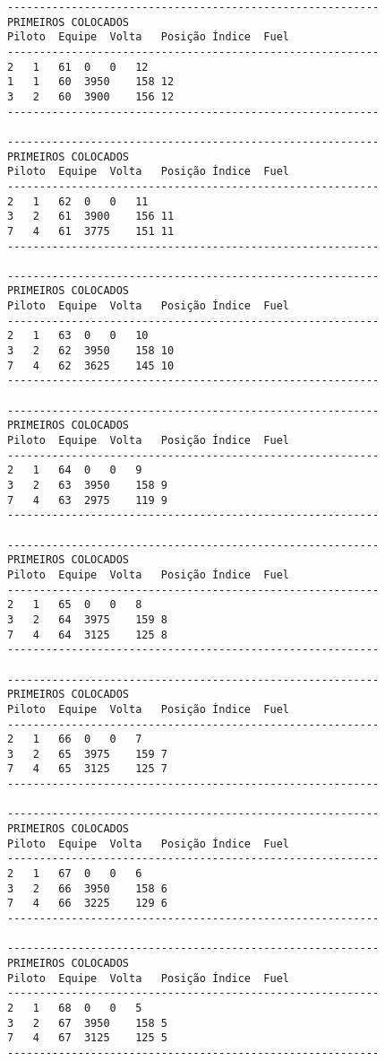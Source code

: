 \documentclass[12pt]{article}
\begin{document}
\begin{verbatim}
----------------------------------------------------------
PRIMEIROS COLOCADOS
Piloto	Equipe	Volta	Posição	Índice	Fuel
----------------------------------------------------------
2	1	61	0	0	12
1	1	60	3950	158	12
3	2	60	3900	156	12
----------------------------------------------------------

----------------------------------------------------------
PRIMEIROS COLOCADOS
Piloto	Equipe	Volta	Posição	Índice	Fuel
----------------------------------------------------------
2	1	62	0	0	11
3	2	61	3900	156	11
7	4	61	3775	151	11
----------------------------------------------------------

----------------------------------------------------------
PRIMEIROS COLOCADOS
Piloto	Equipe	Volta	Posição	Índice	Fuel
----------------------------------------------------------
2	1	63	0	0	10
3	2	62	3950	158	10
7	4	62	3625	145	10
----------------------------------------------------------

----------------------------------------------------------
PRIMEIROS COLOCADOS
Piloto	Equipe	Volta	Posição	Índice	Fuel
----------------------------------------------------------
2	1	64	0	0	9
3	2	63	3950	158	9
7	4	63	2975	119	9
----------------------------------------------------------

----------------------------------------------------------
PRIMEIROS COLOCADOS
Piloto	Equipe	Volta	Posição	Índice	Fuel
----------------------------------------------------------
2	1	65	0	0	8
3	2	64	3975	159	8
7	4	64	3125	125	8
----------------------------------------------------------

----------------------------------------------------------
PRIMEIROS COLOCADOS
Piloto	Equipe	Volta	Posição	Índice	Fuel
----------------------------------------------------------
2	1	66	0	0	7
3	2	65	3975	159	7
7	4	65	3125	125	7
----------------------------------------------------------

----------------------------------------------------------
PRIMEIROS COLOCADOS
Piloto	Equipe	Volta	Posição	Índice	Fuel
----------------------------------------------------------
2	1	67	0	0	6
3	2	66	3950	158	6
7	4	66	3225	129	6
----------------------------------------------------------

----------------------------------------------------------
PRIMEIROS COLOCADOS
Piloto	Equipe	Volta	Posição	Índice	Fuel
----------------------------------------------------------
2	1	68	0	0	5
3	2	67	3950	158	5
7	4	67	3125	125	5
----------------------------------------------------------


\end{verbatim}
\end{document}
